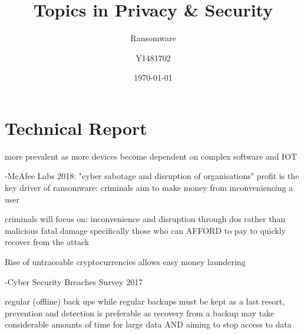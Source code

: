 \documentclass{article}
\title{Topics in Privacy \& Security}
\subtitle{Ransomware}
\author{Y1481702}
\date{\today}
\begin{document}
\begin{titlepage}
\maketitle
\tableofcontents
\end{titlepage}



\section{Technical Report}%





more prevalent as more devices become dependent on complex software and IOT

-McAfee Labs 2018:
"cyber sabotage and disruption of organisations"
profit is the key driver of ransomware: criminals aim to make money from inconveniencing a user

criminals will focus on:
inconvenience and disruption through dos rather than malicious fatal damage
specifically those who can AFFORD to pay to quickly recover from the attack

Rise of untraceable cryptocurrencies allows easy money laundering 


-Cyber Security Breaches Survey 2017

regular (offline) back ups
while regular backups must be kept as a last resort, prevention and detection is preferable as recovery from a backup may take considerable amounts of time for large data AND aiming to stop access to data
\end{document}
